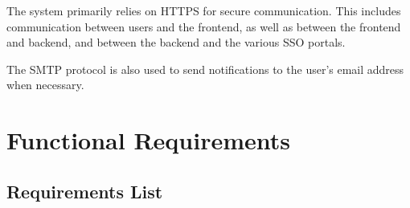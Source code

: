\par The system primarily relies on HTTPS for secure communication. This includes communication between users and the
frontend, as well as between the frontend and backend, and between the backend and the various SSO portals.

\par The SMTP protocol is also used to send notifications to the user's email address when necessary.

\section{Functional Requirements}
\label{sec:functional-requirements}%

\subsection{Requirements List}
\label{subsec:requirements-list}%

\setcounter{requirementCounter}{0}
\newcommand{\nextRequirementID}{
    \stepcounter{requirementCounter}R\ifnum\value{requirementCounter}<10 0\fi\arabic{requirementCounter}
}

